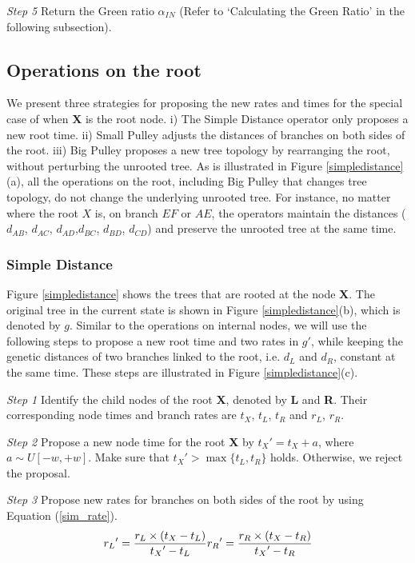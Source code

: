 \documentclass{bmcart}
\begin{document}
\emph{Step 5} Return the Green ratio ${\alpha_{IN}}$ (Refer to `Calculating the Green Ratio' in the following subsection).

\subsection*{Operations on the root}
We present three strategies for proposing the new rates and times for the special case of when \textbf{X} is the root node. i) The Simple Distance operator only proposes a new root time. ii) Small Pulley adjusts the distances of branches on both sides of the root. iii) Big Pulley proposes a new tree topology by rearranging the root, without perturbing the unrooted tree. As is illustrated in Figure \ref{simpledistance}(a), all the operations on the root, including Big Pulley that changes tree topology, do not change the underlying unrooted tree. For instance, no matter where the root $X$ is, on branch $EF$ or $AE$, the operators maintain the distances ($d_{AB}$, $d_{AC}$, $d_{AD}$,$d_{BC}$, $d_{BD}$, $d_{CD}$) and preserve the unrooted tree at the same time.

\subsubsection*{Simple Distance}
Figure \ref{simpledistance} shows the trees that are rooted at the node \textbf{X}. The original tree in the current state is shown in Figure \ref{simpledistance}(b), which is denoted by $g$. Similar to the operations on internal nodes, we will use the following steps to propose a new root time and two rates in ${g}'$, while keeping the genetic distances of two branches linked to the root, i.e. $d_L$ and $d_R$, constant at the same time. These steps are illustrated in Figure \ref{simpledistance}(c).

\emph{Step 1} Identify the child nodes of the root \textbf{X}, denoted by \textbf{L} and \textbf{R}. Their corresponding node times and branch rates are $t_X$, $t_L$, $t_R$ and $r_L$, $r_R$.

\emph{Step 2} Propose a new node time for the root \textbf{X} by ${t_X}' = {t_X} + a$, where $a \sim U[ - w, + w]$. Make sure that ${t_X}' > \max \{ {t_L}, {t_R}\} $ holds. Otherwise, we reject the proposal.

\emph{Step 3} Propose new rates for branches on both sides of the root by using Equation (\ref{sim_rate}).
\begin{equation}
\label{sim_rate}
{r_L}' = \frac{{{r_L} \times ({{t_X} - {t_L}})}}{{{t_X}' - {t_L}}}\\
{r_R}' = \frac{{{r_R} \times ({{t_X} - {t_R}})}}{{{t_X}' - {t_R}}}
 \end{equation}
\end{document}
